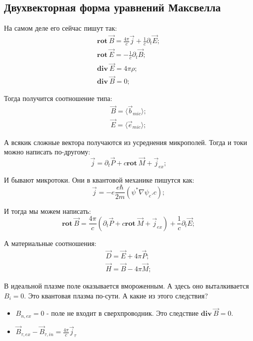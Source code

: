 \documentclass[a4paper, 14pt, russian]{article}
\newcommand{\be}{\begin{equation}}
\newcommand{\ee}{\end{equation}}
\newcommand{\bea}{\begin{eqnarray}}
\newcommand{\eea}{\end{eqnarray}}
\newcommand{\pa}{\partial}
\newcommand{\rot}{\textbf{rot}~}
\renewcommand{\div}{\textbf{div}~}
\begin{document}
	\subsection{Двухвекторная форма уравнений Максвелла}

	На самом деле его сейчас пишут так:
	\bea
		\rot \vec B = \frac{4\pi}{c} \vec j + \frac{1}{c} \pa_t \vec E;\\
		\rot \vec E = - \frac{1}{c} \pa_t \vec B;\\
		\div \vec E = 4 \pi \rho;\\
		\div \vec B = 0;
	\eea

	Тогда получится соотношение типа:
	\bea
		\vec B = \langle \vec{b}_{mic} \rangle;\\
		\vec E = \langle \vec{e}_{mic} \rangle;
	\eea

	А всякик сложные вектора получаются из усреднения микрополей. 
	Тогда и токи можно написать по-другому:
	\be
		\vec j = \pa_t \vec P + c \rot \vec M + \vec{j}_{ex};
	\ee

	И бывают микротоки. Они в квантовой механике пишутся как:
	\be
		\vec j = - e \frac{e\hbar}{2m} (\psi^{*} \nabla \psi _ c.c);
	\ee

	И тогда мы можем написать:
	\be
		\rot \vec B = \frac{4\pi}{c} (\pa_t \vec P + c \rot \vec M + \vec{j}_{ex}) 
			+ \frac{1}{c} \pa_t \vec E;
	\ee

	А материальные соотношения:
	\bea
		\vec D = \vec E + 4 \pi \vec P;\\
		\vec H = \vec B - 4 \pi \vec M;
	\eea

	В идеальной плазме поле оказывается вмороженным. А здесь оно выталкивается
	$B_i = 0$.
	Это квантовая плазма по-сути. А какие из этого следствия?

	\begin{itemize}
		\item $B_{n,ex} = 0$ - поле не входит в сверхпроводник. 
			Это следствие $\div \vec B = 0$.
		\item $\vec{B}_{\tau,ex} - \vec{B}_{\tau,in} = \frac{4\pi}{c} \vec{j}_\tau$
	\end{itemize}

\end{document}
